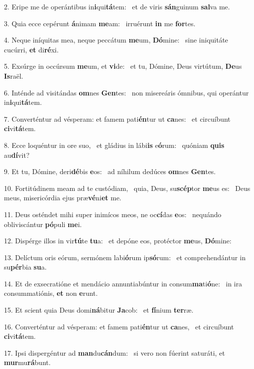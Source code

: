 2. Eripe me de operántibus in\textbf{i}qui\textbf{tá}tem: \ast\  et de viris \textbf{sán}guinum \textbf{sal}va me.\

3. Quia ecce cepérunt \textbf{á}nimam \textbf{me}am: \ast\  irruérunt \textbf{in} me \textbf{for}tes.\

4. Neque iníquitas mea, neque peccátum \textbf{me}um, \textbf{Dó}mine: \ast\  sine iniquitáte cucúrri, \textbf{et} di\textbf{ré}xi.\

5. Exsúrge in occúrsum \textbf{me}um, et \textbf{vi}de: \ast\  et tu, Dómine, Deus virtútum, \textbf{De}us \textbf{Is}raël.\

6. Inténde ad visitándas \textbf{om}nes \textbf{Gen}tes: \ast\  non misereáris ómnibus, qui operántur in\textbf{i}qui\textbf{tá}tem.\

7. Converténtur ad vésperam: et famem pati\textbf{én}tur ut \textbf{ca}nes: \ast\  et circuíbunt \textbf{ci}vi\textbf{tá}tem.\

8. Ecce loquéntur in ore suo, \dag\  et gládius in lábi\textbf{is} e\textbf{ó}rum: \ast\  quóniam \textbf{quis} au\textbf{dí}vit?\

9. Et tu, Dómine, deri\textbf{dé}bis \textbf{e}os: \ast\  ad níhilum dedúces \textbf{om}nes \textbf{Gen}tes.\

10. Fortitúdinem meam ad te custódiam, \dag\  quia, Deus, su\textbf{scép}tor \textbf{me}us es: \ast\  Deus meus, misericórdia ejus præ\textbf{vé}ni\textbf{et} me.\

11. Deus osténdet mihi super inimícos meos, ne oc\textbf{cí}das \textbf{e}os: \ast\  nequándo obliviscántur \textbf{pó}puli \textbf{me}i.\

12. Dispérge illos in vir\textbf{tú}te \textbf{tu}a: \ast\  et depóne eos, protéctor \textbf{me}us, \textbf{Dó}mine:\

13. Delíctum oris eórum, sermónem labi\textbf{ó}rum ip\textbf{só}rum: \ast\  et comprehendántur in su\textbf{pér}bia \textbf{su}a.\

14. Et de exsecratióne et mendácio annuntiabúntur in consum\textbf{ma}ti\textbf{ó}ne: \ast\  in ira consummatiónis, \textbf{et} non \textbf{e}runt.\

15. Et scient quia Deus domi\textbf{ná}bitur \textbf{Ja}cob: \ast\  et \textbf{fí}nium \textbf{ter}ræ.\

16. Converténtur ad vésperam: et famem pati\textbf{én}tur ut \textbf{ca}nes, \ast\  et circuíbunt \textbf{ci}vi\textbf{tá}tem.\

17. Ipsi dispergéntur ad \textbf{man}du\textbf{cán}dum: \ast\  si vero non fúerint saturáti, et \textbf{mur}mu\textbf{rá}bunt.\

